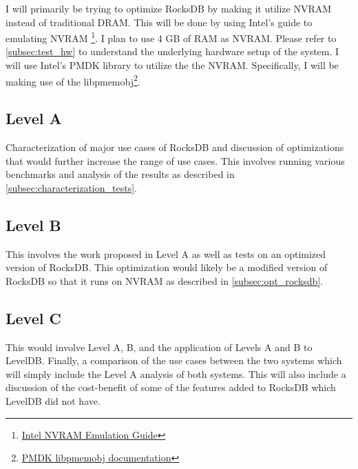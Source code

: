 \documentclass[twocolumn,11pt]{article}
\begin{document}
I will primarily be trying to optimize RocksDB by making it utilize NVRAM
instead of traditional DRAM. This will be done by using Intel's guide to
emulating NVRAM
\footnote{
  \href{https://software.intel.com/en-us/articles/how-to-emulate-persistent-memory-on-an-intel-architecture-server/}
  {Intel NVRAM Emulation Guide}}.
I plan to use 4 GB of RAM as NVRAM. Please refer to \ref{subsec:test_hw} to
understand the underlying hardware setup of the system. I will use Intel's PMDK
library to utilize the the NVRAM. Specifically, I will be making use of the
libpmemobj\footnote{\href{http://pmem.io/pmdk/libpmemobj/}
{PMDK libpmemobj documentation}}.

\subsection{Level A}

Characterization of major use cases of RocksDB and discussion of optimizations
that would further increase the range of use cases. This involves running
various benchmarks and analysis of the results as described in
\ref{subsec:characterization_tests}.

\subsection{Level B}

This involves the work proposed in Level A as well as tests on an optimized
version of RocksDB. This optimization would likely be a modified version of
RocksDB so that it runs on NVRAM as described in \ref{subsec:opt_rocksdb}.

\subsection{Level C}

This would involve Level A, B, and the application of Levels A and B to LevelDB.
Finally, a comparison of the use cases between the two systems which will simply
include the Level A analysis of both systems. This will also include a
discussion of the cost-benefit of some of the features added to RocksDB which
LevelDB did not have.
\end{document}
